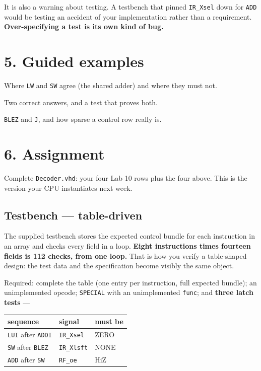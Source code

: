 \documentclass[11pt]{article}
\newcommand{\code}[1]{\texttt{#1}}
\begin{document}
It is also a warning about testing. A testbench that pinned \code{IR\_Xsel} down
for \code{ADD} would be testing an accident of your implementation rather than a
requirement. \textbf{Over-specifying a test is its own kind of bug.}

\section*{5. Guided examples}

\begin{description}[leftmargin=2.4em,style=nextline,itemsep=2pt]
\item[Example 1 --- \code{decode\_lw\_sw}] Where \code{LW} and \code{SW} agree
(the shared adder) and where they must not.
\item[Example 2 --- \code{dontcare}] Two correct answers, and a test that proves
both.
\item[Example 3 --- \code{decode\_flow}] \code{BLEZ} and \code{J}, and how sparse
a control row really is.
\end{description}

\section*{6. Assignment}

Complete \code{Decoder.vhd}: your four Lab 10 rows plus the four above. This is
the version your CPU instantiates next week.

\subsection*{Testbench --- table-driven}

The supplied testbench stores the expected control bundle for each instruction
in an array and checks every field in a loop. \textbf{Eight instructions times
fourteen fields is 112 checks, from one loop.} That is how you verify a
table-shaped design: the test data and the specification become visibly the same
object.

Required: complete the table (one entry per instruction, full expected bundle);
an unimplemented opcode; \code{SPECIAL} with an unimplemented \code{func}; and
\textbf{three latch tests} ---

\begin{center}
\begin{tabular}{lll}
\toprule
sequence & signal & must be \\
\midrule
\code{LUI} after \code{ADDI} & \code{IR\_Xsel} & ZERO \\
\code{SW} after \code{BLEZ} & \code{IR\_Xlsft} & NONE \\
\code{ADD} after \code{SW} & \code{RF\_oe} & HiZ \\
\bottomrule
\end{tabular}
\end{center}
\end{document}
